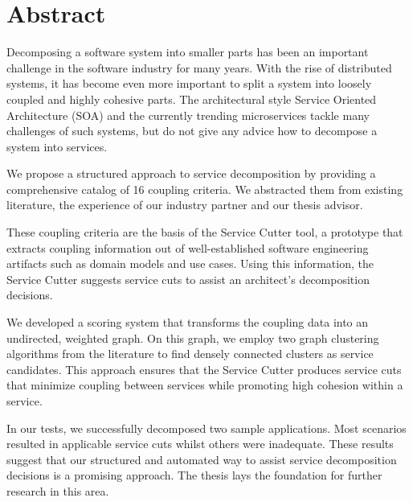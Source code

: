 \chapter{Abstract}

Decomposing a software system into smaller parts has been an important challenge in the software industry for many years. With the rise of distributed systems, it has become even more important to split a system into loosely coupled and highly cohesive parts. The architectural style Service Oriented Architecture (SOA) and the currently trending microservices tackle many challenges of such systems, but do not give any advice how to decompose a system into services.

We propose a structured approach to service decomposition by providing a comprehensive catalog of 16 coupling criteria. We abstracted them from existing literature, the experience of our industry partner and our thesis advisor. 

These coupling criteria are the basis of the Service Cutter tool, a prototype that extracts coupling information out of well-established software engineering artifacts such as domain models and use cases. Using this information, the Service Cutter suggests service cuts to assist an architect’s decomposition decisions. 

We developed a scoring system that transforms the coupling data into an undirected, weighted graph. On this graph, we employ two graph clustering algorithms from the literature to find densely connected clusters as service candidates. This approach ensures that the Service Cutter produces service cuts that minimize coupling between services while promoting high cohesion within a service.

In our tests, we successfully decomposed two sample applications. Most scenarios resulted in applicable service cuts whilst others were inadequate. These results suggest that our structured and automated way to assist service decomposition decisions is a promising approach. The thesis lays the foundation for further research in this area.
